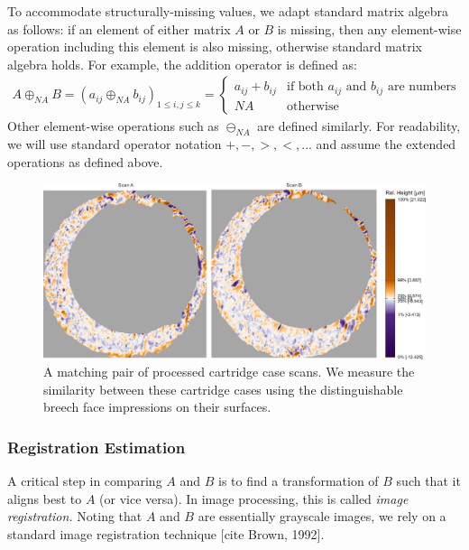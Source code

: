 \documentclass[
]{jdssv}
\begin{document}
To accommodate structurally-missing values, we adapt standard matrix
algebra as follows: if an element of either matrix \(A\) or \(B\) is
missing, then any element-wise operation including this element is also
missing, otherwise standard matrix algebra holds. For example, the
addition operator is defined as: \begin{align*}
A \oplus_{NA} B = (a_{ij} \oplus_{NA} b_{ij})_{1 \leq i,j \leq k} = 
\begin{cases}
a_{ij} + b_{ij} & \text{if both $a_{ij}$ and $b_{ij}$ are numbers} \\
NA &\text{otherwise}
\end{cases}
\end{align*} Other element-wise operations such as \(\ominus_{NA}\) are
defined similarly. For readability, we will use standard operator
notation \(+, -, >, <, ...\) and assume the extended operations as
defined above.

\begin{CodeChunk}
\begin{figure}[htbp]

{\centering \includegraphics[width=\textwidth]{figures/matchPair} 

}

\caption{\label{fig:matchPair} A matching pair of processed cartridge case scans. We measure the similarity between these cartridge cases using the distinguishable breech face impressions on their surfaces.}\label{fig:unnamed-chunk-6}
\end{figure}
\end{CodeChunk}

\hypertarget{registration-estimation}{%
\subsubsection{Registration Estimation}\label{registration-estimation}}

A critical step in comparing \(A\) and \(B\) is to find a transformation
of \(B\) such that it aligns best to \(A\) (or vice versa). In image
processing, this is called \emph{image registration.} Noting that \(A\)
and \(B\) are essentially grayscale images, we rely on a standard image
registration technique {[}cite Brown, 1992{]}.
\end{document}
